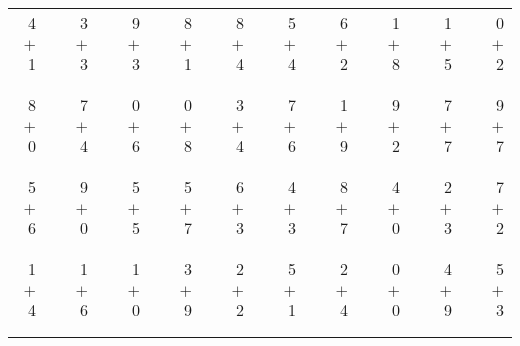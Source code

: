 \documentclass[12pt, letterpaper]{article}
\begin{document}
\begin{tabular}{rrrrrrrrrrrrrrrrrrr}
4 & & 3 & & 9 & & 8 & & 8 & & 5 & & 6 & & 1 & & 1 & & 0\\
$+$ 1 & & $+$ 3 & & $+$ 3 & & $+$ 1 & & $+$ 4 & & $+$ 4 & & $+$ 2 & & $+$ 8 & & $+$ 5 & & $+$ 2\\
\cline{1-1} \cline{3-3} \cline{5-5} \cline{7-7} \cline{9-9} \cline{11-11} \cline{13-13} \cline{15-15} \cline{17-17} \cline{19-19} \\ \\
8 & & 7 & & 0 & & 0 & & 3 & & 7 & & 1 & & 9 & & 7 & & 9\\
$+$ 0 & & $+$ 4 & & $+$ 6 & & $+$ 8 & & $+$ 4 & & $+$ 6 & & $+$ 9 & & $+$ 2 & & $+$ 7 & & $+$ 7\\
\cline{1-1} \cline{3-3} \cline{5-5} \cline{7-7} \cline{9-9} \cline{11-11} \cline{13-13} \cline{15-15} \cline{17-17} \cline{19-19} \\ \\
5 & & 9 & & 5 & & 5 & & 6 & & 4 & & 8 & & 4 & & 2 & & 7\\
$+$ 6 & & $+$ 0 & & $+$ 5 & & $+$ 7 & & $+$ 3 & & $+$ 3 & & $+$ 7 & & $+$ 0 & & $+$ 3 & & $+$ 2\\
\cline{1-1} \cline{3-3} \cline{5-5} \cline{7-7} \cline{9-9} \cline{11-11} \cline{13-13} \cline{15-15} \cline{17-17} \cline{19-19} \\ \\
1 & & 1 & & 1 & & 3 & & 2 & & 5 & & 2 & & 0 & & 4 & & 5\\
$+$ 4 & & $+$ 6 & & $+$ 0 & & $+$ 9 & & $+$ 2 & & $+$ 1 & & $+$ 4 & & $+$ 0 & & $+$ 9 & & $+$ 3\\
\cline{1-1} \cline{3-3} \cline{5-5} \cline{7-7} \cline{9-9} \cline{11-11} \cline{13-13} \cline{15-15} \cline{17-17} \cline{19-19} \\ \\
\end{tabular}
\newpage
\end{document}
